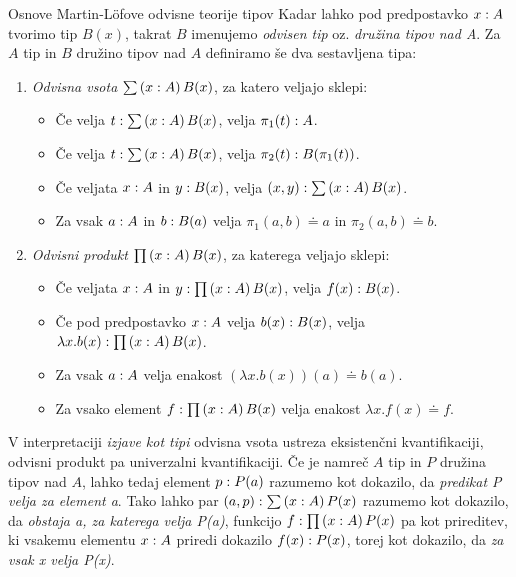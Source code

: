 \documentclass[a4paper, slovene]{article}
\begin{document}
\begin{section}{Osnove Martin-Löfove odvisne teorije tipov}
  Kadar lahko pod predpostavko \(x : A\) tvorimo tip \(B(x)\), takrat \(B\)
  imenujemo \emph{odvisen tip} oz. \emph{družina tipov nad A}.
  Za \(A\) tip in \(B\) družino tipov nad \(A\) definiramo še dva sestavljena tipa:

  \begin{enumerate}
  \item \emph{Odvisna vsota} \(\sum \left( x : A \right) B(x)\), za katero veljajo sklepi:
    \begin{itemize}
    \item Če velja \(t : \sum \left( x : A \right) B(x)\),
      velja \(\pi_{1}(t) : A\).
    \item Če velja \(t : \sum \left( x : A \right) B(x)\),
      velja \(\pi_{2}(t) : B(\pi_{1}(t))\).
    \item Če veljata \(x : A\) in \(y : B(x)\), velja
      \((x, y) : \sum \left( x : A \right) B(x)\).
    \item Za vsak \(a : A\) in \(b : B(a)\) velja
      \(\pi_{1}(a, b) \doteq a\) in \(\pi_{2}(a, b) \doteq b \).
    \end{itemize}
  \item \emph{Odvisni produkt} \(\prod \left( x : A \right) B(x)\), za katerega veljajo sklepi:
    \begin{itemize}
    \item Če veljata \(x : A\) in
      \(y : \prod \left( x : A \right) B(x)\), velja
      \(f(x) : B(x)\).
    \item Če pod predpostavko \(x : A\) velja \(b(x) : B(x)\),
      velja \(\lambda x.b(x) : \prod \left( x : A \right) B(x)\).
    \item Za vsak \(a : A\) velja enakost \((\lambda x.b(x))(a) \doteq b(a)\).
    \item Za vsako element \(f : \prod \left( x : A \right) B(x)\)
      velja enakost \(\lambda x.f(x) \doteq f\).
    \end{itemize}
  \end{enumerate}

  V interpretaciji \emph{izjave kot tipi} odvisna vsota ustreza
  eksistenčni kvantifikaciji,
  odvisni produkt pa univerzalni kvantifikaciji.
  Če je namreč \(A\) tip in \(P\) družina tipov nad \(A\), lahko tedaj
  element \(p : P(a)\) razumemo kot dokazilo, da
  \emph{predikat P velja za element a}. Tako lahko par
  \((a, p) : \sum \left( x : A \right) P(x)\) razumemo kot dokazilo, da
  \emph{obstaja a, za katerega velja P(a)}, funkcijo
  \(f : \prod \left( x : A \right) P(x)\) pa kot prireditev, ki vsakemu elementu
  \(x : A\) priredi dokazilo \(f(x) : P(x)\), torej kot
  dokazilo, da \emph{za vsak x velja P(x)}.
\end{section}
\end{document}

